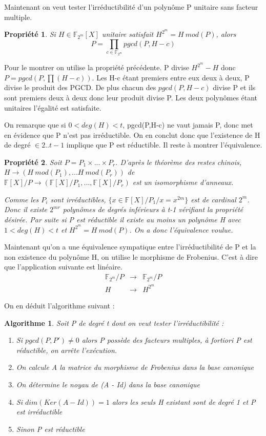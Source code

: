 \documentclass{article}
\newtheorem{prop}{Propriété}
\newtheorem{algo}{Algorithme}
\begin{document}
		Maintenant on veut tester l'irréductibilité d'un polynôme P unitaire sans facteur multiple.
		\begin{prop}
			Si $H \in \mathbb{F}_{2^{m}}[X]$ unitaire satisfait $H^{2^{m}} = H \ mod(P)$, alors 
			$$P = \prod_{c\in \mathbb{F}_{2^{m}}}pgcd(P,H-c)$$
		\end{prop}

		Pour le montrer on utilise la propriété précédente.
		P divise $H^{2^{m}} - H$ donc $P = pgcd(P,\prod(H-c))$.
		Les H-c étant premiers entre eux deux à deux, P divise le produit des PGCD.
		De plus chacun des $pgcd(P,H-c)$ divise P et ils sont premiers deux à deux donc leur produit divise P.
		Les deux polynômes étant unitaires l'égalité est satisfaite.

		On remarque que si $0<deg(H) <t$, pgcd(P,H-c) ne vaut jamais P, donc met en évidence que P n'est pas irréductible.
		On en conclut donc que l'existence de H  de degré $\in 2..t-1$ implique que P est réductible.
		Il reste à montrer l'équivalence.

		\begin{prop}
			Soit $P = P_{1} \times ... \times P_{r}$.
			D'après le théorème des restes chinois, $H \rightarrow (H \ mod(P_{1}),...H \ mod(P_{r}))$ de $\mathbb{F}[X]/P \rightarrow (\mathbb{F}[X]/P_{1},...,\mathbb{F}[X]/P_{r})$ est un isomorphisme d'anneaux.

			Comme les $P_{i}$ sont irréductibles, $\{x \in \mathbb{F}[X]/P_{1}/ x = x^{2{m}} \}$ est de cardinal $2^{m}$.
			Donc il existe $2^{mr}$ polynômes de degrés inférieurs à t-1 vérifiant la propriété désirée.
			Par suite si P est réductible il existe au moins un polynôme H avec $1 < deg(H) < t$ et $H^{2^{m}} = H \ mod(P)$.
			On a donc l'équivalence voulue.
		\end{prop}

		Maintenant qu'on a une équivalence sympatique entre l'irréductibilité de P et la non existence du polynôme H, on utilise le morphisme de Frobenius.
		C'est à dire que l'application suivante est linéaire.
		\begin{eqnarray*}
			\mathbb{F}_{2^{m}}/P &\rightarrow& \mathbb{F}_{2^{m}}/P \\
			H &\rightarrow& H^{2^{m}}
		\end{eqnarray*}

		On en déduit l'algorithme suivant :
		\begin{algo}
			Soit P de degré t dont on veut tester l'irréductibilité :
			\begin{enumerate}
				\item Si $pgcd(P,P') \neq 0$ alors P possède des facteurs multiples, à fortiori P est réductible, on arrête l’exécution.
				\item On calcule A la matrice du morphisme de Frobenius dans la base canonique
				\item On détermine le noyau de (A - Id) dans la base canonique
				\item Si $dim(Ker(A-Id)) = 1$ alors les seuls H existant sont de degré 1 et P est irréductible
				\item Sinon P est réductible
			\end{enumerate}
		\end{algo}
\end{document}
